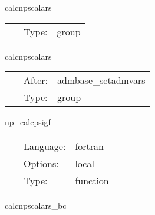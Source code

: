 
\hspace{5mm} calcnpscalars 

\hspace{5mm}{\it calculate npscalars } 


\hspace{5mm}

 \begin{tabular*}{160mm}{cll} 
~ & Type:  & group \\ 
\end{tabular*} 


\vspace{5mm}


\hspace{5mm} calcnpscalars 

\hspace{5mm}{\it calculate npscalars } 


\hspace{5mm}

 \begin{tabular*}{160mm}{cll} 
~ & After:  & admbase\_setadmvars \\ 
~ & Type:  & group \\ 
\end{tabular*} 


\vspace{5mm}


\hspace{5mm} np\_calcpsigf 

\hspace{5mm}{\it calculate psi4 as grid function } 


\hspace{5mm}

 \begin{tabular*}{160mm}{cll} 
~ & Language:  & fortran \\ 
~ & Options:  & local \\ 
~ & Type:  & function \\ 
\end{tabular*} 


\vspace{5mm}


\hspace{5mm} calcnpscalars\_bc 

\hspace{5mm}{\it boundary conditions } 


